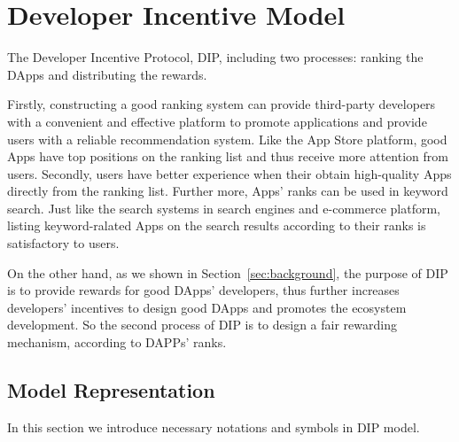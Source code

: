\section{Developer Incentive Model}
The Developer Incentive Protocol, DIP, including two processes: ranking the DApps and distributing the rewards.

Firstly, constructing a good ranking system can provide third-party developers with a convenient and effective platform to promote applications and provide users with a reliable recommendation system. Like the App Store platform, good Apps have top positions on the ranking list and thus receive more attention from users. Secondly, users have better experience when their obtain high-quality Apps directly from the ranking list. Further more, Apps' ranks can be used in keyword search. Just like the search systems in search engines and e-commerce platform,  listing keyword-ralated Apps on the search results according to their ranks is satisfactory to users.

On the other hand, as we shown in Section~\ref{sec:background}, the purpose of DIP is to provide rewards for good DApps' developers, thus further increases developers' incentives to design good DApps and promotes the ecosystem development. So the second process of DIP is to design a fair rewarding mechanism, according to DAPPs' ranks.

\subsection{Model Representation}
\label{subsection:parameters}
In this section we introduce necessary notations and symbols in DIP model.

